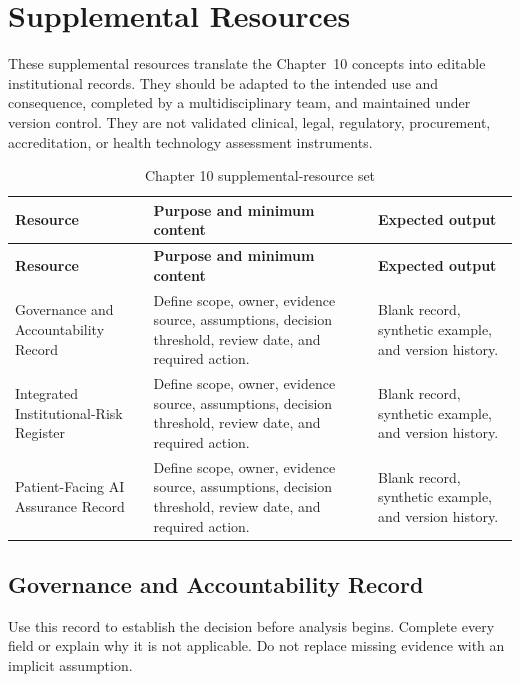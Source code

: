 \section{Supplemental Resources}
\label{sec:comp-ch10-supplemental}

These supplemental resources translate the Chapter~10 concepts into editable
institutional records. They should be adapted to the intended use and consequence,
completed by a multidisciplinary team, and maintained under version control. They
are not validated clinical, legal, regulatory, procurement, accreditation, or health
technology assessment instruments.

\begin{longtable}{@{}p{}p{}p{}@{}}
\caption{Chapter 10 supplemental-resource set}
\label{tab:comp-ch10-supplemental-set}\\
\toprule
\textbf{Resource} & \textbf{Purpose and minimum content} & \textbf{Expected output} \\
\midrule
\endfirsthead
\toprule
\textbf{Resource} & \textbf{Purpose and minimum content} & \textbf{Expected output} \\
\midrule
\endhead
\bottomrule
\endlastfoot
Governance and Accountability Record & Define scope, owner, evidence source, assumptions, decision threshold, review date, and required action. & Blank record, synthetic example, and version history. \\
Integrated Institutional-Risk Register & Define scope, owner, evidence source, assumptions, decision threshold, review date, and required action. & Blank record, synthetic example, and version history. \\
Patient-Facing AI Assurance Record & Define scope, owner, evidence source, assumptions, decision threshold, review date, and required action. & Blank record, synthetic example, and version history. \\
\end{longtable}

\subsection{Governance and Accountability Record}
\label{sec:comp-ch10-supp-1}
Use this record to establish the decision before analysis begins. Complete every
field or explain why it is not applicable. Do not replace missing evidence with an
implicit assumption.

